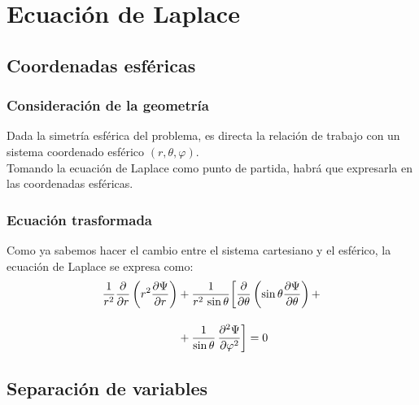 \documentclass[12pt]{beamer}
\begin{document}
\section{Ecuación de Laplace}
\subsection{Coordenadas esféricas}

\begin{frame}
\frametitle{Consideración de la geometría}
Dada la simetría esférica del problema, es directa la relación de trabajo con un sistema coordenado esférico $(r, \theta, \varphi)$.
\\
\bigskip
\pause
Tomando la ecuación de Laplace como punto de partida, habrá que expresarla en las coordenadas esféricas.
\end{frame}
\begin{frame}
\frametitle{Ecuación trasformada}
Como ya sabemos hacer el cambio entre el sistema cartesiano y el esférico, la ecuación de Laplace se expresa como:
\begin{align}
\begin{aligned}[b]
\dfrac{1}{r^{2}} \pdv{r} \left( r^{2} \pdv{\Psi}{r} \right) &+ \dfrac{1}{r^{2} \, \sin \theta} \bigg[ \pdv{\theta} \left( \sin \theta \pdv{\Psi}{\theta} \right) + \\[1em]
&+ \dfrac{1}{\sin \theta} \, \pdv[2]{\Psi}{\varphi} \bigg] = 0
\end{aligned}
\label{eq:ecuacion_22_15}
\end{align}
\end{frame}

\subsection{Separación de variables}
\end{document}
